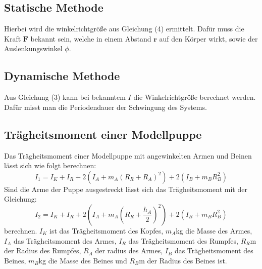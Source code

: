\subsection{Statische Methode}
Hierbei wird die winkelrichtgröße aus Gleichung (4) ermittelt. Dafür muss die
Kraft $\symbf{F}$ bekannt sein, welche in einem Abstand $\symbf{r}$ auf den Körper wirkt,
sowie der Auslenkungswinkel $\phi$.
\subsection{Dynamische Methode}
Aus Gleichung (3) kann bei bekanntem $I$ die Winkelrichtgröße berechnet werden. Dafür
misst man die Periodendauer der Schwingung des Systems.

\subsection{Trägheitsmoment einer Modellpuppe}
Das Trägheitsmoment einer Modellpuppe mit angewinkelten Armen und Beinen lässt sich
wie folgt berechnen:
\begin{equation}
  I_1 = I_K + I_R + 2(I_A + m_A(R_R + R_A)^2) + 2(I_B + m_B R_B^2)
\end{equation}
Sind die Arme der Puppe ausgestreckt lässt sich das Trägheitsmoment mit der
Gleichung:
\begin{equation}
  I_2 = I_K + I_R + 2(I_A + m_A(R_R + \frac{h_A}{2})^2) + 2(I_B + m_B R_B^2)
\end{equation}
berechnen.
$I_K$ ist das Trägheitsmoment des Kopfes,
$m_A$kg die Masse des Armes,
$I_A$  das Trägheitsmoment des Armes, $I_R$ das Trägheitsmoment des Rumpfes,
$R_R$m der Radius des Rumpfes, $R_A$ der radius des Armes, $I_B$ das Trägheitsmoment des Beines,
$m_B$kg die Masse des Beines und $R_B$m der Radius des Beines ist.
